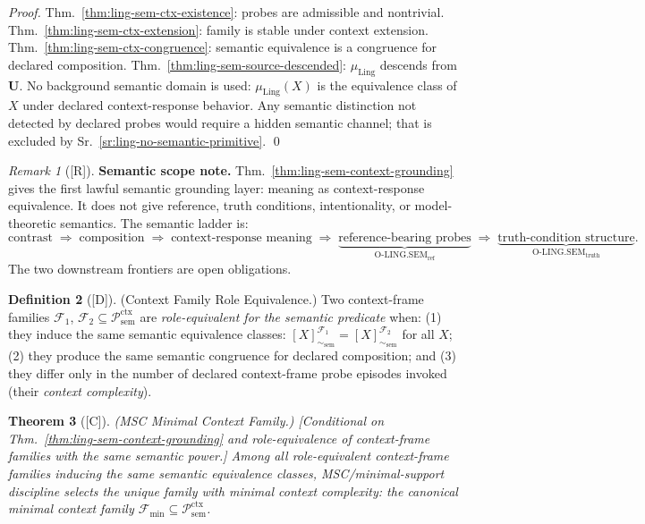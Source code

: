\documentclass[12pt,oneside]{amsbook}
\theoremstyle{plain}
\newtheorem{theorem}{Theorem}[section]
\theoremstyle{definition}
\newtheorem{definition}[theorem]{Definition}
\theoremstyle{remark}
\newtheorem{remark}[theorem]{Remark}
\newcommand{\status}[1]{\textup{[#1]}}
\begin{document}
\begin{proof}
Thm.~\ref{thm:ling-sem-ctx-existence}: probes are admissible and
nontrivial. Thm.~\ref{thm:ling-sem-ctx-extension}: family is
stable under context extension. Thm.~\ref{thm:ling-sem-ctx-congruence}:
semantic equivalence is a congruence for declared composition.
Thm.~\ref{thm:ling-sem-source-descended}: $\mu_{\mathrm{Ling}}$
descends from $\mathbf{U}$. No background semantic domain is
used: $\mu_{\mathrm{Ling}}(X)$ is the equivalence class of $X$
under declared context-response behavior. Any semantic distinction
not detected by declared probes would require a hidden semantic
channel; that is excluded by Sr.~\ref{sr:ling-no-semantic-primitive}.
\qed
\end{proof}

\begin{remark}[\status{R}]\label{rem:ling-SEM-scope}
\textbf{Semantic scope note.}
Thm.~\ref{thm:ling-sem-context-grounding} gives the first lawful
semantic grounding layer: meaning as context-response equivalence.
It does not give reference, truth conditions, intentionality, or
model-theoretic semantics. The semantic ladder is:
\[
 \text{contrast} \;\Rightarrow\;
 \text{composition} \;\Rightarrow\;
 \text{context-response meaning} \;\Rightarrow\;
 \underbrace{\text{reference-bearing probes}}_{\mathrm{O\text{-}LING.SEM}_{\mathrm{ref}}}
 \;\Rightarrow\;
 \underbrace{\text{truth-condition structure}}_{\mathrm{O\text{-}LING.SEM}_{\mathrm{truth}}}.
\]
The two downstream frontiers are open obligations.
\end{remark}

\begin{definition}[\status{D}]\label{def:ling-context-family-role}
\textup{(Context Family Role Equivalence.)}
Two context-frame families $\mathcal{F}_1$, $\mathcal{F}_2
\subseteq \mathcal{P}_{\mathrm{sem}}^{\mathrm{ctx}}$ are
\emph{role-equivalent for the semantic predicate} when:
(1) they induce the same semantic equivalence classes:
$[X]_{\sim_{\mathrm{sem}}}^{\mathcal{F}_1} =
[X]_{\sim_{\mathrm{sem}}}^{\mathcal{F}_2}$ for all $X$;
(2) they produce the same semantic congruence for declared
composition; and (3) they differ only in the number of declared
context-frame probe episodes invoked (their \emph{context complexity}).
\end{definition}

\begin{theorem}[\status{C}]\label{thm:ling-sem-MSC-context}
\textup{(MSC Minimal Context Family.)}
\textup{[Conditional on Thm.~\ref{thm:ling-sem-context-grounding}
and role-equivalence of context-frame families with the same
semantic power.]}
Among all role-equivalent context-frame families inducing the
same semantic equivalence classes, MSC/minimal-support discipline
selects the unique family with minimal context complexity: the
\emph{canonical minimal context family}
$\mathcal{F}_{\min} \subseteq \mathcal{P}_{\mathrm{sem}}^{\mathrm{ctx}}$.
\end{theorem}
\end{document}
